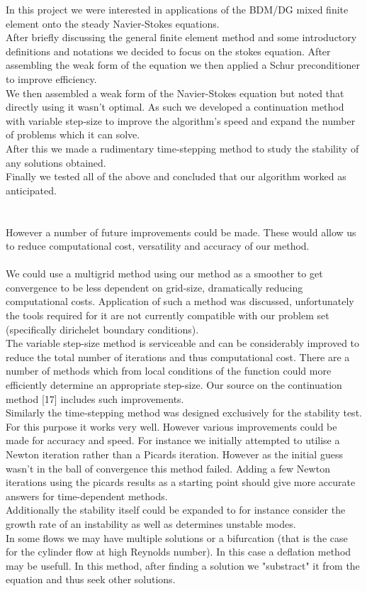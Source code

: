 \documentclass[11pt,twoside,a4paper]{article}
\begin{document}
In this project we were interested in applications of the BDM/DG mixed finite element onto the steady Navier-Stokes equations.\\
After briefly discussing the general finite element method and some introductory definitions and notations we decided to focus on the stokes equation. After assembling the weak form of the equation we then applied a Schur preconditioner to  improve efficiency.\\
We then assembled a weak form of the Navier-Stokes equation but noted that directly using it wasn't optimal. As such we developed a continuation method with variable step-size to improve the algorithm's speed and expand the number of problems which it can solve.\\
After this we made a rudimentary time-stepping method to study the stability of any solutions obtained.\\
Finally we tested all of the above and concluded that our algorithm worked as anticipated.\\
\\
\\
However a number of future improvements could be made.
These would allow us to reduce computational cost, versatility and accuracy of our method.\\
\\
We could use a multigrid method using our method as a smoother to get convergence to be less dependent on grid-size, dramatically reducing computational costs. Application of such a method was discussed, unfortunately the tools required for it are not currently compatible with our problem set (specifically dirichelet boundary conditions).\\
The variable step-size method is serviceable and can be considerably improved to reduce the total number of iterations and thus computational cost. There are a number of methods which from local conditions of the function could more efficiently determine an appropriate step-size. Our source on the continuation method [17] includes such improvements.\\
Similarly the time-stepping method was designed exclusively for the stability test. For this purpose it works very well. However various improvements could be made for accuracy and speed. For instance we initially attempted to utilise a Newton iteration rather than a Picards iteration. However as the initial guess wasn't in the ball of convergence this method failed. Adding a few Newton iterations using the picards results as a starting point should give more accurate answers for time-dependent methods.\\
Additionally the stability itself could be expanded to for instance consider the growth rate of an instability as well as determines unstable modes.\\
In some flows we may have multiple solutions or a bifurcation (that is the case for the cylinder flow at high Reynolds number). In this case a deflation method may be usefull. In this method, after finding a solution we "substract" it from the equation and thus seek other solutions.\\
\\
\end{document}
